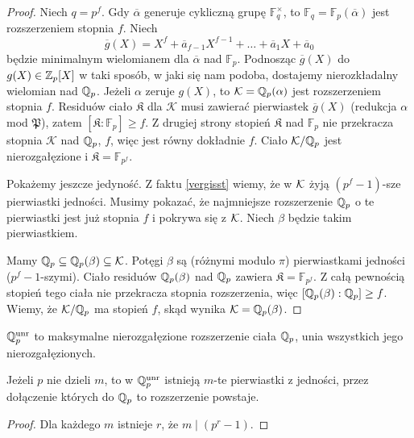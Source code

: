 \begin{proof}
	Niech $q = p^f$.
	Gdy $\overline \alpha$ generuje cykliczną grupę $\mathbb F ^\times_q$, to $\mathbb F_q = \mathbb F_p(\overline \alpha)$ jest rozszerzeniem stopnia $f$.
	Niech
	\[
		\overline g(X) = X^f + \overline{a}_{f-1} X^{f-1} + \ldots + \overline{a}_1 X + \overline{a}_0
	\]
	będzie minimalnym wielomianem dla $\overline \alpha$ nad $\mathbb F_p$.
	Podnosząc $\overline g(X)$ do $g(X) \in \mathbb Z_p[X]$ w taki sposób, w jaki się nam podoba, dostajemy nierozkładalny wielomian nad $\mathbb Q_p$.
	Jeżeli $\alpha$ zeruje $g(X)$, to $\mathcal K = \mathbb Q_p(\alpha)$ jest rozszerzeniem stopnia $f$.
	Residuów ciało $\mathfrak K$ dla $\mathcal K$ musi zawierać pierwiastek $\overline g(X)$ (redukcja $\alpha$ mod $\mathfrak P$), zatem $[\mathfrak K : \mathbb F_p] \ge f$.
	Z drugiej strony stopień $\mathfrak K$ nad $\mathbb F_p$ nie przekracza stopnia $\mathcal K$ nad $\mathbb Q_p$, $f$, więc jest równy dokładnie $f$.
	Ciało $\mathcal K / \mathbb Q_p$ jest nierozgałęzione i $\mathfrak K = \mathbb F_{p^f}$.

	Pokażemy jeszcze jedyność.
	Z faktu \ref{vergisst} wiemy, że w $\mathcal K$ żyją $(p^f-1)$-sze pierwiastki jedności.
	Musimy pokazać, że najmniejsze rozszerzenie $\mathbb Q_p$ o te pierwiastki jest już stopnia $f$ i pokrywa się z $\mathcal K$.
	Niech $\beta$ będzie takim pierwiastkiem.

	Mamy $\mathbb Q_p \subseteq \mathbb Q_p(\beta) \subseteq \mathcal K$.
	Potęgi $\beta$ są (różnymi modulo $\pi$) pierwiastkami jedności ($p^f-1$-szymi).
	Ciało residuów $\mathbb Q_p(\beta)$ nad $\mathbb Q_p$ zawiera $\mathfrak K = \mathbb F_{p^f}$.
	Z całą pewnością stopień tego ciała nie przekracza stopnia rozszerzenia, więc $[\mathbb Q_p(\beta) : \mathbb Q_p] \ge f$.
	Wiemy, że $\mathcal K / \mathbb Q_p$ ma stopień $f$, skąd wynika $\mathcal K = \mathbb Q_p(\beta)$.
\end{proof}

\begin{definicja}
	$\mathbb Q_p^{\textrm{unr}}$ to maksymalne nierozgałęzione rozszerzenie ciała $\mathbb Q_p$, unia wszystkich jego nierozgałęzionych.
\end{definicja}

\begin{fakt}
	Jeżeli $p$ nie dzieli $m$, to w $\mathbb Q_p^{\textrm{unr}}$ istnieją $m$-te pierwiastki z jedności, przez dołączenie których do $\mathbb Q_p$ to rozszerzenie powstaje.
\end{fakt}

\begin{proof}
	Dla każdego $m$ istnieje $r$, że $m \mid (p^r - 1)$.
\end{proof}

